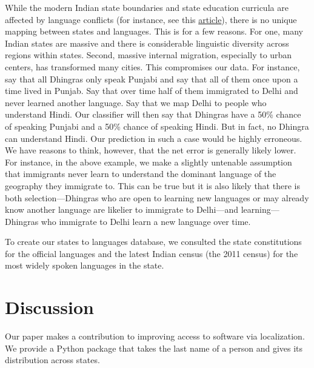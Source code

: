 \documentclass[11pt,  letterpaper]{article}
\begin{document}
While the modern Indian state boundaries and state education curricula are affected by language conflicts (for instance, see this \href{https://en.wikipedia.org/wiki/Anti-Hindi_agitations_of_Tamil_Nadu}{article}), there is no unique mapping between states and languages. This is for a few reasons. For one, many Indian states are massive and there is considerable linguistic diversity across regions within states. Second, massive internal migration, especially to urban centers, has transformed many cities. This compromises our data. For instance, say that all Dhingras only speak Punjabi and say that all of them once upon a time lived in Punjab. Say that over time half of them immigrated to Delhi and never learned another language. Say that we map Delhi to people who understand Hindi. Our classifier will then say that Dhingras have a 50\% chance of speaking Punjabi and a 50\% chance of speaking Hindi. But in fact, no Dhingra can understand Hindi. Our prediction in such a case would be highly erroneous. We have reasons to think, however, that the net error is generally likely lower. For instance, in the above example, we make a slightly untenable assumption that immigrants never learn to understand the dominant language of the geography they immigrate to. This can be true but it is also likely that there is both selection—Dhingras who are open to learning new languages or may already know another language are likelier to immigrate to Delhi—and learning—Dhingras who immigrate to Delhi learn a new language over time. 

To create our states to languages database, we consulted the state constitutions for the official languages and the latest Indian census (the 2011 census) for the most widely spoken languages in the state.

\section{Discussion}

Our paper makes a contribution to improving access to software via localization. We provide a Python package that takes the last name of a person and gives its distribution across states. 
\end{document}
